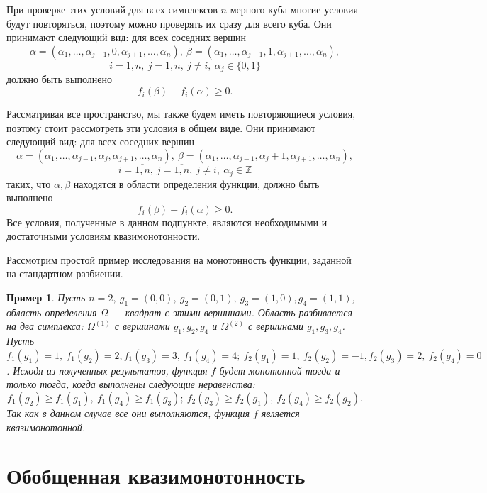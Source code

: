 \documentclass{article}
\renewcommand{\ge}{\geqslant}
\newtheorem{example}{Пример}
\theoremstyle{definition}
\begin{document}
При проверке этих условий для всех симплексов \(n\)-мерного куба многие условия будут повторяться, поэтому можно проверять их сразу для всего куба. Они принимают следующий вид: для всех соседних вершин
\[\alpha = (\alpha_1, \dots, \alpha_{j-1}, 0, \alpha_{j+1},\dots, \alpha_n),\ \beta = (\alpha_1, \dots, \alpha_{j-1}, 1, \alpha_{j+1},\dots, \alpha_n),\]
\[i = \overline{1, n},\ j = \overline{1, n},\ j\neq i,\ \alpha_j \in \{0, 1\}\]
должно быть выполнено
\[f_i(\beta) - f_i(\alpha) \ge 0.\]

Рассматривая все пространство, мы также будем иметь повторяющиеся условия, поэтому стоит рассмотреть эти условия в общем виде. Они принимают следующий вид: для всех соседних вершин
\[\alpha = (\alpha_1, \dots, \alpha_{j-1}, \alpha_j, \alpha_{j+1},\dots, \alpha_n),\ \beta = (\alpha_1, \dots, \alpha_{j-1}, \alpha_j + 1, \alpha_{j+1},\dots, \alpha_n),\]
\[i = \overline{1, n},\ j = \overline{1, n},\ j\neq i,\ \alpha_j \in \mathbb Z\]
таких, что \(\alpha, \beta\) находятся в области определения функции, должно быть выполнено
\[f_i(\beta) - f_i(\alpha) \ge 0.\]
Все условия, полученные в данном подпункте, являются необходимыми и достаточными условиям квазимонотонности.

Рассмотрим простой пример исследования на монотонность функции, заданной на стандартном разбиении.
\begin{example}
	Пусть \(n = 2,\ g_1 = (0, 0),\ g_2 = (0, 1),\ g_3 = (1, 0), g_4 = (1, 1)\), область определения \(\Omega\) --- квадрат с этими вершинами. Область разбивается на два симплекса: \(\Omega^{(1)}\) с вершинами \(g_1, g_2, g_4\) и \(\Omega^{(2)}\) с вершинами \(g_1, g_3, g_4\). Пусть \(f_1(g_1) = 1,\ f_1(g_2) = 2, f_1(g_3) = 3,\ f_1(g_4) = 4;\ f_2(g_1) = 1,\ f_2(g_2) = -1, f_2(g_3) = 2,\ f_2(g_4) = 0 \). Исходя из полученных результатов, функция \(f\) будет монотонной тогда и только тогда, когда выполнены следующие неравенства:
	\[
		f_1(g_2) \ge f_1(g_1),\ f_1(g_4) \ge f_1(g_3);\ f_2(g_3) \ge f_2(g_1),\ f_2(g_4) \ge f_2(g_2).
	\]
	Так как в данном случае все они выполняются, функция \(f\) является квазимонотонной.
\end{example}

\section{Обобщенная квазимонотонность}
\end{document}
